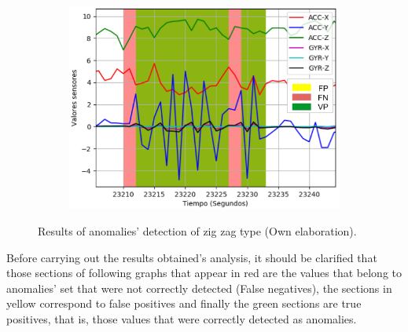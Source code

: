 \begin{figure}[H]
{\begin{varwidth}{\textwidth}
\begin{subfigure}[h]{0.45\textwidth}
            \includegraphics[width=\textwidth]{imagenes/Cap5/zig_zag3}
        \end{subfigure} 
        \end{varwidth}}
        \caption{Results of anomalies' detection of zig zag type (Own elaboration).}
		\label{fig:resultados_zigzag}
    \end{figure}
 
Before carrying out the results obtained's analysis, it should be clarified that those sections of following graphs that appear in red are the values that belong to anomalies' set that were not correctly detected (False negatives), the sections in yellow correspond to false positives and finally the green sections are true positives, that is, those values that were correctly detected as anomalies.   

\vspace{5mm} %

